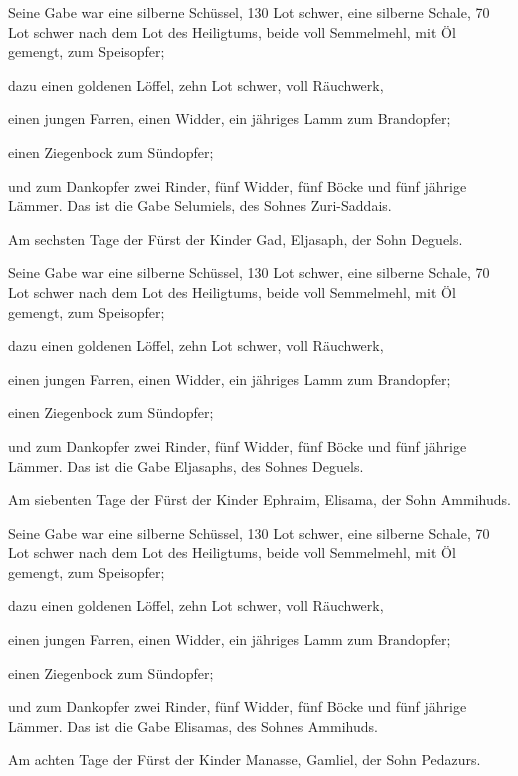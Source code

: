  Seine Gabe war eine silberne Schüssel, 130 Lot schwer,
eine silberne Schale, 70 Lot schwer nach dem Lot des Heiligtums, beide
voll Semmelmehl, mit Öl gemengt, zum Speisopfer;

 dazu einen goldenen Löffel, zehn Lot schwer, voll
Räuchwerk,

 einen jungen Farren, einen Widder, ein jähriges Lamm zum
Brandopfer;

 einen Ziegenbock zum Sündopfer;

 und zum Dankopfer zwei Rinder, fünf Widder, fünf Böcke und
fünf jährige Lämmer. Das ist die Gabe Selumiels, des Sohnes
Zuri-Saddais.

 Am sechsten Tage der Fürst der Kinder Gad, Eljasaph, der
Sohn Deguels.

 Seine Gabe war eine silberne Schüssel, 130 Lot schwer,
eine silberne Schale, 70 Lot schwer nach dem Lot des Heiligtums, beide
voll Semmelmehl, mit Öl gemengt, zum Speisopfer;

 dazu einen goldenen Löffel, zehn Lot schwer, voll
Räuchwerk,

 einen jungen Farren, einen Widder, ein jähriges Lamm zum
Brandopfer;

 einen Ziegenbock zum Sündopfer;

 und zum Dankopfer zwei Rinder, fünf Widder, fünf Böcke und
fünf jährige Lämmer. Das ist die Gabe Eljasaphs, des Sohnes Deguels.

 Am siebenten Tage der Fürst der Kinder Ephraim, Elisama,
der Sohn Ammihuds.

 Seine Gabe war eine silberne Schüssel, 130 Lot schwer,
eine silberne Schale, 70 Lot schwer nach dem Lot des Heiligtums, beide
voll Semmelmehl, mit Öl gemengt, zum Speisopfer;

 dazu einen goldenen Löffel, zehn Lot schwer, voll
Räuchwerk,

 einen jungen Farren, einen Widder, ein jähriges Lamm zum
Brandopfer;

 einen Ziegenbock zum Sündopfer;

 und zum Dankopfer zwei Rinder, fünf Widder, fünf Böcke und
fünf jährige Lämmer. Das ist die Gabe Elisamas, des Sohnes Ammihuds.

 Am achten Tage der Fürst der Kinder Manasse, Gamliel, der
Sohn Pedazurs.

